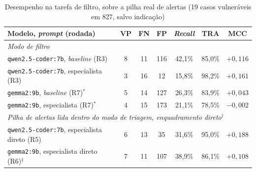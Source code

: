\begin{table}[htpb]
    \centering
    \caption[Desempenho na tarefa de filtro]{Desempenho na tarefa de filtro, sobre a pilha real de alertas (19 casos vulneráveis em 827, salvo indicação)}
    \label{tab:filtro}
    \renewcommand{\arraystretch}{1.4}
    \small
    \begin{tabular}{|l|c|c|c|c|c|c|}
        \hline
        \textbf{Modelo, \textit{prompt} (rodada)} & \textbf{VP} & \textbf{FN} & \textbf{FP} & \textbf{\textit{Recall}} & \textbf{TRA} & \textbf{MCC} \\
        \hline
        \multicolumn{7}{|l|}{\textit{Modo de filtro}} \\
        \hline
        \texttt{qwen2.5-coder:7b}, \textit{baseline} (R3) & 8 & 11 & 116 & 42,1\% & 85,0\% & $+0{,}116$ \\
        \hline
        \texttt{qwen2.5-coder:7b}, especialista (R3) & 3 & 16 & 12 & 15,8\% & 98,2\% & $+0{,}161$ \\
        \hline
        \texttt{gemma2:9b}, \textit{baseline} (R7)$^{*}$ & 5 & 14 & 127 & 26,3\% & 83,9\% & $+0{,}043$ \\
        \hline
        \texttt{gemma2:9b}, especialista (R7)$^{*}$ & 4 & 15 & 173 & 21,1\% & 78,5\% & $-0{,}002$ \\
        \hline
        \multicolumn{7}{|l|}{\textit{Pilha de alertas lida dentro do modo de triagem, enquadramento direto}$^{\dagger}$} \\
        \hline
        \texttt{qwen2.5-coder:7b}, especialista direto (R5) & 6 & 13 & 35 & 31,6\% & 95,0\% & $+0{,}188$ \\
        \hline
        \texttt{gemma2:9b}, especialista direto (R6)$^{\ddagger}$ & 7 & 11 & 107 & 38,9\% & 86,1\% & $+0{,}108$ \\
        \hline
    \end{tabular}
    \par{}
    \fontepesquisa
\end{table}

